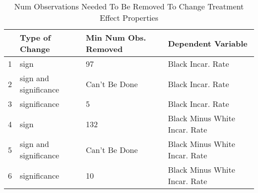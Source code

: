 \begin{table}[ht]
\centering
\begin{tabular}{rlll}
  \hline
 & Type of Change & Min Num Obs. Removed & Dependent Variable \\ 
  \hline
1 & sign & 97 & Black Incar. Rate \\ 
  2 & sign and significance & Can't Be Done & Black Incar. Rate \\ 
  3 & significance & 5 & Black Incar. Rate \\ 
  4 & sign & 132 & Black Minus White Incar. Rate \\ 
  5 & sign and significance & Can't Be Done & Black Minus White Incar. Rate \\ 
  6 & significance & 10 & Black Minus White Incar. Rate \\ 
   \hline
\end{tabular}
\caption{Num Observations Needed To Be Removed To Change Treatment Effect Properties} 
\label{table_mip}
\end{table}
